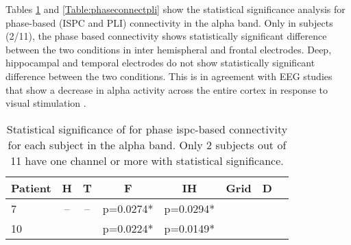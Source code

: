 \documentclass[11pt, onecolumn]{article}
\begin{document}
Tables \ref{Table:phaseconnectispc} and \ref{Table:phaseconnectpli} show the statistical significance analysis for phase-based (ISPC and PLI) connectivity in the alpha band.
Only in subjects (2/11), the phase based connectivity shows statistically significant difference between the two conditions in inter hemispheral and frontal electrodes. Deep, hippocampal and temporal electrodes do not show statistically significant difference between the two conditions. This is in agreement with EEG studies that show a decrease in alpha activity across the entire cortex in response to visual stimulation \citep{barry2007eeg}.

\begin{table}
\centering
\begin{tabular}{l*{6}{c}r}
Patient & H & T & F & IH & Grid & D  \\
\hline
7 &  -- & -- &  p=0.0274* &   p=0.0294* &  &  \\ 
10 &  &  & p=0.0224* & p=0.0149* & & \\ 
\end{tabular}
\caption{\label{Table:phaseconnectispc} 
Statistical significance of for phase ispc-based connectivity for each subject in the alpha band. Only 2 subjects out of 11 have one channel or more with statistical significance.
}
\end{table}


\end{document}
